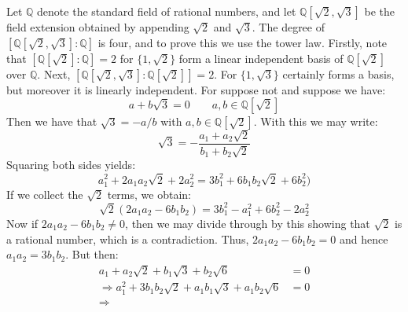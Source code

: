     \begin{example}
        Let $\mathbb{Q}$ denote the standard field of rational numbers, and
        let $\mathbb{Q}[\sqrt{2},\sqrt{3}]$ be the field extension obtained
        by appending $\sqrt{2}$ and $\sqrt{3}$. The degree of
        $[\mathbb{Q}[\sqrt{2},\sqrt{3}]:\mathbb{Q}]$ is four, and to prove
        this we use the tower law. Firstly, note that
        $[\mathbb{Q}[\sqrt{2}]:\mathbb{Q}]=2$ for $\{1,\sqrt{2}\}$ form a
        linear independent basis of $\mathbb{Q}[\sqrt{2}]$ over
        $\mathbb{Q}$. Next,
        $[\mathbb{Q}[\sqrt{2},\sqrt{3}]:\mathbb{Q}[\sqrt{2}]]=2$. For
        $\{1,\sqrt{3}\}$ certainly forms a basis, but moreover it is
        linearly independent. For suppose not and suppose we have:
        \begin{equation}
            a+b\sqrt{3}=0\quad\quad
            a,b\in\mathbb{Q}[\sqrt{2}]
        \end{equation}
        Then we have that $\sqrt{3}=\minus{a}/b$ with
        $a,b\in\mathbb{Q}[\sqrt{2}]$. With this we may write:
        \begin{equation}
            \sqrt{3}=\minus\frac{a_{1}+a_{2}\sqrt{2}}{b_{1}+b_{2}\sqrt{2}}
        \end{equation}
        Squaring both sides yields:
        \begin{equation}
            a_{1}^{2}+2a_{1}a_{2}\sqrt{2}+2a_{2}^{2}=
            3b_{1}^{2}+6b_{1}b_{2}\sqrt{2}+6b_{2}^{2})
        \end{equation}
        If we collect the $\sqrt{2}$ terms, we obtain:
        \begin{equation}
            \sqrt{2}(2a_{1}a_{2}-6b_{1}b_{2})=
            3b_{1}^{2}-a_{1}^{2}+6b_{2}^{2}-2a_{2}^{2}
        \end{equation}
        Now if $2a_{1}a_{2}-6b_{1}b_{2}\ne{0}$, then we may divide through
        by this showing that $\sqrt{2}$ is a rational number, which is a
        contradiction. Thus, $2a_{1}a_{2}-6b_{1}b_{2}=0$ and hence
        $a_{1}a_{2}=3b_{1}b_{2}$. But then:
        \begin{align}
            a_{1}+a_{2}\sqrt{2}+b_{1}\sqrt{3}+b_{2}\sqrt{6}&=0\\
            \Rightarrow
            a_{1}^{2}+3b_{1}b_{2}\sqrt{2}
                +a_{1}b_{1}\sqrt{3}+a_{1}b_{2}\sqrt{6}&=0\\
            \Rightarrow
        \end{align}
    \end{example}
